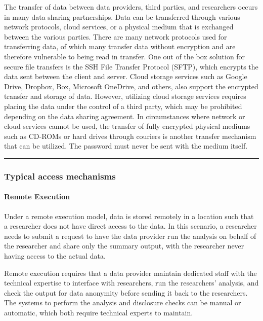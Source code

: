 The transfer of data between data providers, third parties, and
researchers occurs in many data sharing partnerships. Data can be
transferred through various network protocols, cloud services, or a
physical medium that is exchanged between the various parties. There are
many network protocols used for transferring data, of which many
transfer data without encryption and are therefore vulnerable to being
read in transfer. One out of the box solution for secure file transfers
is the SSH File Transfer Protocol (SFTP), which encrypts the data sent
between the client and server. Cloud storage services such as Google
Drive, Dropbox, Box, Microsoft OneDrive, and others, also support the
encrypted transfer and storage of data. However, utilizing cloud storage
services requires placing the data under the control of a third party,
which may be prohibited depending on the data sharing agreement. In
circumstances where network or cloud services cannot be used, the
transfer of fully encrypted physical mediums such as CD-ROMs or hard
drives through couriers is another transfer mechanism that can be
utilized. The password must never be sent with the medium itself.

\begin{center}\rule{0.5\linewidth}{\linethickness}\end{center}

\hypertarget{typical-access-mechanisms}{%
\subsubsection{Typical access
mechanisms}\label{typical-access-mechanisms}}

\hypertarget{remote-execution}{%
\paragraph{Remote Execution}\label{remote-execution}}

Under a remote execution model, data is stored remotely in a location
such that a researcher does not have direct access to the data. In this
scenario, a researcher needs to submit a request to have the data
provider run the analysis on behalf of the researcher and share only the
summary output, with the researcher never having access to the actual
data.

Remote execution requires that a data provider maintain dedicated staff
with the technical expertise to interface with researchers, run the
researchers' analysis, and check the output for data anonymity before
sending it back to the researchers. The systems to perform the analysis
and disclosure checks can be manual or automatic, which both require
technical experts to maintain.

